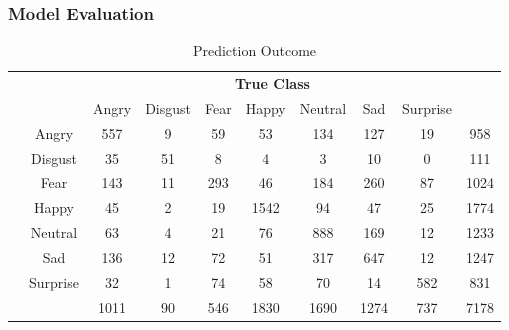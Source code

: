 \documentclass[11pt,a4paper]{article}
\begin{document}
    \subsubsection{Model Evaluation}
    \begin{table}[H]
        \centering
        \begin{tabular}{c|c|c|c|c|c|c|c|c|c}
             & & \multicolumn{7}{c}{\textbf{True Class}} \\ \cline{3-9}
             & & Angry & Disgust & Fear & Happy & Neutral & Sad & Surprise \\ \cline{2-10}
            \parbox[t]{2mm}{} & Angry & 557  &       9  &      59  &      53  &     134  &     127  &      19 & 958 \\ 
             & Disgust & 35  &      51  &       8  &       4  &       3  &      10  &       0 & 111 \\ 
             & Fear & 143  &      11  &     293  &      46  &     184  &     260  &      87 & 1024 \\ 
             & Happy & 45  &       2  &      19  &    1542  &      94  &      47  &      25 & 1774 \\ 
             & Neutral & 63  &       4  &      21  &      76  &     888  &     169  &      12 & 1233 \\ 
             & Sad & 136  &      12  &      72  &      51  &     317  &     647  &      12 & 1247 \\ 
             & Surprise & 32  &       1  &      74  &      58  &      70  &      14  &     582 & 831 \\ 
              & & 1011 & 90 & 546 & 1830 & 1690 & 1274 & 737 & 7178
        \end{tabular}
        \caption{Prediction Outcome}
        \label{tab:prediction_outcome}
    \end{table}
    
\end{document}
